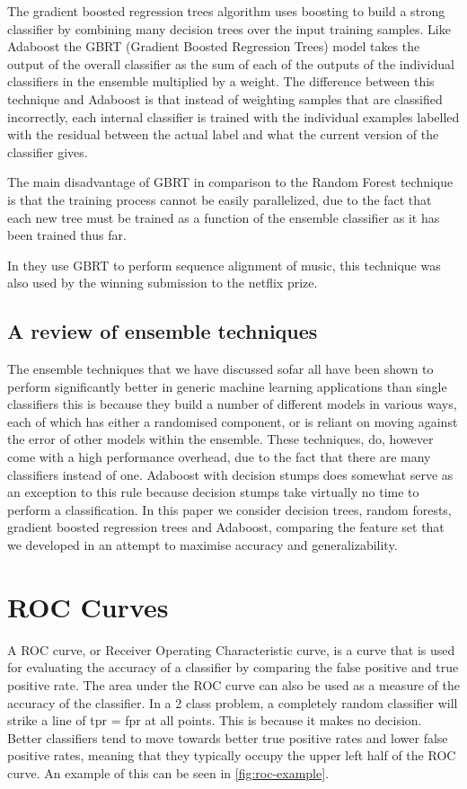\documentclass[ %
                    author={Sam Phippen},
                supervisor={Dr. Rafal Bogacz},
                     title={Real time voice activity detectors in noisy personal computing environments},
                  subtitle={},
                    degree={MEng},
                      year={2012} ]{thesis}
\begin{document}
The gradient boosted regression trees algorithm uses boosting to build a strong
classifier by combining many decision trees over the input training samples.
Like Adaboost the GBRT (Gradient Boosted Regression Trees) model takes the
output of the overall classifier as the sum of each of the outputs of the
individual classifiers in the ensemble multiplied by a weight. The difference
between this technique and Adaboost is that instead of weighting samples that
are classified incorrectly, each internal classifier is trained with the
individual examples labelled with the residual between the actual label and
what the current version of the classifier gives.

The main disadvantage of GBRT in comparison to the Random Forest technique is
that the training process cannot be easily parallelized, due to the fact that
each new tree must be trained as a function of the ensemble classifier as it
has been trained thus far.

In \cite{parker} they use GBRT to perform sequence alignment of music, this
technique was also used by the winning submission to the netflix prize.

\subsection{A review of ensemble techniques}

The ensemble techniques that we have discussed sofar all have been shown to
perform significantly better in generic machine learning applications than
single classifiers this is because they build a number of different models in
various ways, each of which has either a randomised component, or is reliant on
moving against the error of other models within the ensemble. These techniques,
do, however come with a high performance overhead, due to the fact that there
are many classifiers instead of one. Adaboost with decision stumps does
somewhat serve as an exception to this rule because decision stumps take
virtually no time to perform a classification. In this paper we consider
decision trees, random forests, gradient boosted regression trees and Adaboost,
comparing the feature set that we developed in an attempt to maximise accuracy
and generalizability.

\section{ROC Curves}

A ROC curve, or Receiver Operating Characteristic curve, is a curve that is
used for evaluating the accuracy of a classifier by comparing the false
positive and true positive rate. The area under the ROC curve can also be used
as a measure of the accuracy of the classifier. In a 2 class problem, a
completely random classifier will strike a line of tpr = fpr at all points.
This is because it makes no decision. Better classifiers tend to move towards
better true positive rates and lower false positive rates, meaning that they
typically occupy the upper left half of the ROC curve. An example of this can
be seen in \ref{fig:roc-example}.
\end{document}
